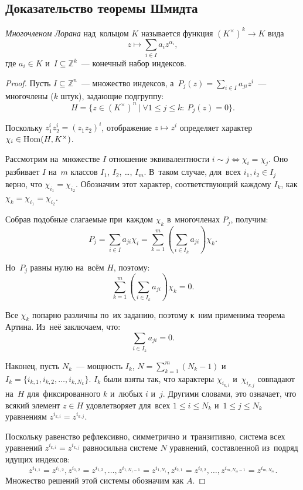 \documentclass[a4paper,oneside]{article}
\begin{document}
\subsection{Доказательство теоремы Шмидта}
\textit{Многочленом Лорана} над~кольцом $K$ называется функция $(K^\times)^k \rightarrow K$ вида
\[
  z \mapsto \sum_{i \in I} a_i z^{\alpha_i},
\]
где $a_i \in K$ и~$I \subseteq \mathbb{Z}^k$~— конечный набор индексов.

\begin{proof}
  Пусть $I \subseteq \mathbb{Z}^n$~— множество индексов,
  а~$P_j(z) = \sum_{i \in I} a_{ji} z^i$~— многочлены ($k$ штук), задающие подгруппу:
  \[
    H = \{ z \in (K^{\times})^n\ |\ \forall 1 \leq j \leq k{:}\ P_j(z) = 0 \}.
  \]

  Поскольку $z_1^{i} z_2^{i} = (z_1 z_2)^i$, отображение $z \mapsto z^i$ определяет
  характер $\chi_i \in \mathrm{Hom}(H, K^{\times})$.

  Рассмотрим на~множестве $I$ отношение эквивалентности $i \sim j \Leftrightarrow \chi_i = \chi_j$.
  Оно разбивает $I$ на~$m$ классов $I_1$, $I_2$, …, $I_m$. В~таком случае, для~всех $i_1, i_2 \in I_j$ верно, что $\chi_{i_1} = \chi_{i_2}$.
  Обозначим этот характер, соответствующий каждому $I_k$, как $\chi_k = \chi_{i_1} = \chi_{i_2}$.

  Собрав подобные слагаемые при~каждом $\chi_k$ в~многочленах $P_j$, получим:
  \[
    P_j = \sum_{i \in I} a_{ji} \chi_i = \sum_{k = 1}^{m} \left( \sum_{i \in I_k} a_{ji} \right) \chi_k.
  \]

  Но~$P_j$ равны нулю на~всём $H$, поэтому:
  \[
    \sum_{k = 1}^{m} \left( \sum_{i \in I_k} a_{ji} \right) \chi_k = 0.
  \]

  Все $\chi_k$ попарно различны по~их заданию, поэтому к~ним применима теорема Артина. Из~неё заключаем, что:
  \[
    \sum_{i \in I_k} a_{ji} = 0.
  \]

  Наконец, пусть $N_k$~— мощность $I_k$, $N = \sum_{k = 1}^m (N_k - 1)$ и~$I_k = \{i_{k, 1},\allowbreak i_{k, 2},\allowbreak \ldots,\allowbreak i_{k, N_k}\}$.
  $I_k$ были взяты так, что характеры $\chi_{i_{k, i}}$ и~$\chi_{i_{k, j}}$ совпадают на~$H$ для~фиксированного $k$ и~любых $i$ и~$j$.
  Другими словами, это означает, что всякий элемент $z \in H$ удовлетворяет для~всех $1 \leq i \leq N_k$ и~$1 \leq j \leq N_k$
  уравнениям $z^{i_{k, i}} = z^{i_{k, j}}$.

  Поскольку равенство рефлексивно, симметрично и~транзитивно, система всех уравнений $z^{i_{k, i}} = z^{i_{k, j}}$ равносильна
  системе $N$ уравнений, составленной из~подряд идущих индексов:
  \[
    z^{i_{1, 1}} = z^{i_{1, 2}}, z^{i_{1, 2}} = z^{i_{1, 3}}, \ldots, z^{i_{1, N_1 - 1}} = z^{i_{1, N_1}}, z^{i_{2, 1}} = z^{i_{2, 2}}, \ldots, z^{i_{m, N_m - 1}} = z^{i_{m, N_m}}.
  \]
  Множество решений этой системы обозначим как $A$.


\end{proof}
\end{document}
